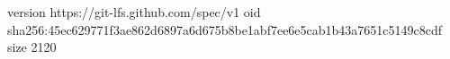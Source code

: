 version https://git-lfs.github.com/spec/v1
oid sha256:45ec629771f3ae862d6897a6d675b8be1abf7ee6e5cab1b43a7651c5149c8cdf
size 2120
